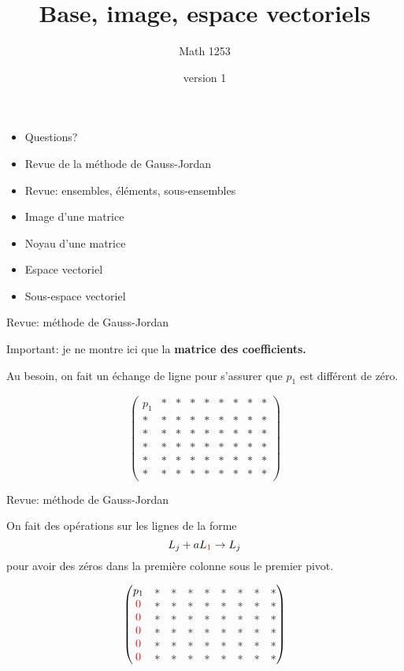 \documentclass[french, handout]{beamer}
\title{Base, image, espace vectoriels}
\author{Math 1253} %
\date{version 1}   %
\begin{document}
	\frame{\titlepage}
	
	\begin{frame}
	\begin{itemize}
	\item Questions?
	\item Revue de la méthode de Gauss-Jordan
	\item Revue: ensembles, éléments, sous-ensembles
	\item Image d'une matrice
	\item Noyau d'une matrice
	\item Espace vectoriel
	\item Sous-espace vectoriel
	\end{itemize}
\end{frame}	


\begin{frame}{Revue: méthode de Gauss-Jordan}

Important: je ne montre ici que la \textbf{matrice des coefficients.}
\vfill

Au besoin, on fait un échange de ligne pour s'assurer
que $p_1$ est différent de zéro.

\[
\begin{pmatrix}
p_1 & *  & * & * & * & * & * & * & * \\
* & *  & * & * & * & * & * & * & * \\
* & *  & * & * & * & * & * & * & * \\
* & *  & * & * & * & * & * & * & * \\
* & *  & * & * & * & * & * & * & * \\
* & *  & * & * & * & * & * & * & *
\end{pmatrix}
\]

\end{frame}	
	
\begin{frame}{Revue: méthode de Gauss-Jordan}

On fait des opérations sur les lignes de la forme 
\Huge
\[
 L_j + a L_{\color{red}1} \rightarrow L_j
\]
\normalsize
pour avoir des zéros dans la première colonne sous le premier pivot.

\[
\begin{pmatrix}
p_1 & *  & * & * & * & * & * & * & * \\
{\color{red}{0}} & * & * & * & * & * & * & * & * \\
{\color{red}{0}} & * & * & * & * & * & * & * & * \\
{\color{red}{0}} & * & * & * & * & * & * & * & * \\
{\color{red}{0}} & * & * & * & * & * & * & * & * \\
{\color{red}{0}} & * & * & * & * & * & * & * & * 
\end{pmatrix}
\]
\end{frame}	
\end{document}
